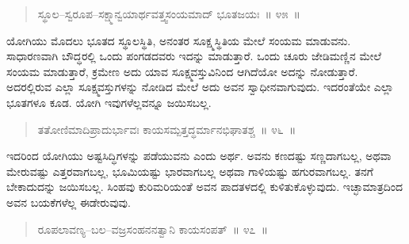 \vspace{-0.25cm}

\begin{verse}
ಸ್ಥೂಲ–ಸ್ವರೂಪ–ಸಕ್ಷ್ಮಾನ್ವಯಾರ್ಥವತ್ತ್ವಸಂಯಮಾದ್​ ಭೂತಜಯಃ~॥ ೪೫~॥
\end{verse}

\vspace{-0.4cm}


\vspace{0.1cm}

ಯೋಗಿಯು ಮೊದಲು ಭೂತದ ಸ್ಥೂಲಸ್ಥಿತಿ, ಅನಂತರ ಸೂಕ್ಷ್ಮಸ್ಥಿತಿಯ ಮೇಲೆ ಸಂಯಮ ಮಾಡುವನು. ಸಾಧಾರಣವಾಗಿ ಬೌದ್ಧರಲ್ಲಿ ಒಂದು ಪಂಗಡದವರು ಇದನ್ನು ಮಾಡುತ್ತಾರೆ. ಒಂದು ಚೂರು ಜೇಡಿಮಣ್ಣಿನ ಮೇಲೆ ಸಂಯಮ ಮಾಡುತ್ತಾರೆ, ಕ್ರಮೇಣ ಅದು ಯಾವ ಸೂಕ್ಷ್ಮವಸ್ತುವಿನಿಂದ ಆಗಿದೆಯೋ ಅದನ್ನು ನೋಡುತ್ತಾರೆ. ಅದರಲ್ಲಿರುವ ಎಲ್ಲಾ ಸೂಕ್ಷ್ಮವಸ್ತುಗಳನ್ನು ನೋಡಿದ ಮೇಲೆ ಅದು ಅವನ ಸ್ವಾಧೀನವಾಗುವುದು. ಇದರಂತೆಯೇ ಎಲ್ಲಾ ಭೂತಗಳೂ ಕೂಡ. ಯೋಗಿ ಇವುಗಳೆಲ್ಲವನ್ನೂ ಜಯಿಸಬಲ್ಲ. 

\vspace{-0.25cm}

\begin{verse}
ತತೋಣಿಮಾದಿಪ್ರಾದುರ್ಭಾವಃ ಕಾಯಸಮ್ಪತ್ತದ್ಧರ್ಮಾನಭಿಘಾತಶ್ಚ~॥ ೪೬~॥
\end{verse}

\vspace{-0.4cm}


\vspace{0.1cm}

ಇದರಿಂದ ಯೋಗಿಯು ಅಷ್ಟಸಿದ್ಧಿಗಳನ್ನು ಪಡೆಯುವನು ಎಂದು ಅರ್ಥ. ಅವನು ಕಣದಷ್ಟು ಸಣ್ಣದಾಗಬಲ್ಲ, ಅಥವಾ ಮೇರುವಷ್ಟು ಎತ್ತರವಾಗಬಲ್ಲ, ಭೂಮಿಯಷ್ಟು ಭಾರವಾಗಬಲ್ಲ ಅಥವಾ ಗಾಳಿಯಷ್ಟು ಹಗುರವಾಗಬಲ್ಲ. ತನಗೆ ಬೇಕಾದುದನ್ನು ಜಯಿಸಬಲ್ಲ. ಸಿಂಹವು ಕುರಿಮರಿಯಂತೆ ಅವನ ಪಾದತಳದಲ್ಲಿ ಕುಳಿತುಕೊಳ್ಳುವುದು. ಇಚ್ಛಾಮಾತ್ರದಿಂದ ಅವನ ಬಯಕೆಗಳೆಲ್ಲ ಈಡೇರುವುವು. 

\vspace{-0.25cm}

\begin{verse}
ರೂಪಲಾವಣ್ಯ–ಬಲ–ವಜ್ರಸಂಹನನತ್ವಾನಿ ಕಾಯಸಂಪತ್​~॥ ೪೭~॥
\end{verse}

\vspace{-0.4cm}


\vspace{0.1cm}

